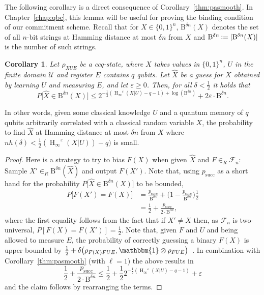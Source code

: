 \documentclass[final,11pt,a4paper]{report}
\newtheorem{corollary}[theorem]{Corollary}
\newcounter{itm}
\newcommand*{\assign}{\ensuremath{\kern.5ex\raisebox{.1ex}{\mbox{\rm:}}\kern -.3em =}}
\newcommand*{\cU}{\mathcal{U}}
\newcommand*{\nbit}{\set{0,1}^n}
\newcommand*{\set}[1]{\{#1\}}          %
\newcommand*{\ball}[1]{{\mathrm{B}}^{#1}}  %
\renewcommand*{\I}{\mathbbm{1}}
\renewcommand*{\H}{\operatorname{H}}   %
\newcommand*{\hmin}{\ensuremath{\H_{\infty}}}
\newcommand*{\hie}[2]{\ensuremath{\hmin^{#1}(#2)}}
\newcommand*{\hiee}[1]{\hie{\varepsilon}{#1}}
\newcommand*{\dist}[1]{\delta\big(#1\big)}  %
\newcommand*{\eps}{\varepsilon}
\renewcommand*{\P}{P}            %
\newcommand*{\regE}{E}
\newcommand*{\univ}{two-universal\xspace}
\newcommand*{\chf}[1]{\ensuremath{\mathcal{F}_{#1}}} %
\begin{document}
The following corollary is a direct consequence of
Corollary~\ref{thm:pasmooth}. %
In Chapter~\ref{chap:qbc}, this lemma will be useful for proving the
binding condition of our commitment scheme. Recall that for $X \in
\nbit$, $\ball{\delta n}(X)$ denotes the set of all $n$-bit strings at
Hamming distance at most $\delta n$ from $X$ and $\ball{\delta n}
\assign |\ball{\delta n}(X)|$ is the number of such strings.
\begin{corollary}\label{cor:guess}
  Let $\rho_{X U \regE}$ be a ccq-state, where $X$ takes values in
  $\nbit$, $U$ in the finite domain $\cU$ and register $\regE$
  contains $q$ qubits.  Let $\hat{X}$ be a guess for $X$ obtained by
  learning $U$ and measuring $\regE$, and let $\eps \geq 0$. Then, for
  all $\delta< \frac{1}{2}$ it holds that
\[ \P\bigl[ \hat{X} \in \ball{\delta n}(X) \bigr] \leq 2^{-\frac{1}{2}
  (\hiee{X|U}-q-1) + \log(\ball{\delta n})} + 2\eps \cdot \ball{\delta n}.
\]
\end{corollary}
In other words, given some classical knowledge $U$ and a quantum
memory of $q$ qubits arbitrarily correlated with a classical random
variable $X$, the probability to find $\hat{X}$ at Hamming distance at
most $\delta n$ from $X$ where $nh(\delta)< \frac{1}{2}
(\hiee{X|U})-q)$ is small.
\begin{proof}
  Here is a strategy to try to bias $F(X)$ when given $\hat{X}$ and
  $F\in_R \chf{n}$: Sample $X' \in_R \ball{\delta n}(\hat{X})$ and
  output $F(X')$.  Note that, using $p_{\text{succ}}$ as a short hand
  for the probability $\P\big[ \hat{X} \in \ball{\delta n}(X) \big]$
  to be bounded,
\begin{align*}
\P\bigl[ F(X')=F(X) \bigr]
&=  \frac{p_{\text{succ}}}{\ball{\delta n}} +  
  \bigg(1- \frac{p_{\text{succ}}}{\ball{\delta n}} \bigg) \frac{1}{2} \\[1ex]
&= \frac{1}{2} + \frac{p_{\text{succ}}}{2 \cdot \ball{\delta n}},
\end{align*}
where the first equality follows from the fact that if \mbox{$X'\neq
  X$} then, as $\chf{n}$ is \univ, $\P\left[ F(X)=F(X')
\right]=\frac{1}{2}$.  Note that, given $F$ and $U$ and being allowed
to measure $\regE$, the probability of correctly guessing a binary
$F(X)$ is upper bounded by 
$\frac{1}{2}+\dist{ \rho_{F(X)F U \regE},\I\otimes\rho_{F U \regE} }$~\cite{FG99}.  In
combination with Corollary~\ref{thm:pasmooth} (with $\ell=1$) the above results in
\begin{equation*}
\frac{1}{2} + \frac{p_{\text{succ}}}{2 \cdot \ball{\delta n}} \leq \frac{1}{2}+ 
  \frac{1}{2} 2^{-\frac{1}{2}({\hiee{X|U}-q-1}) }+ \eps
\end{equation*}
and the claim follows by rearranging the terms. 
\end{proof}
\end{document}

